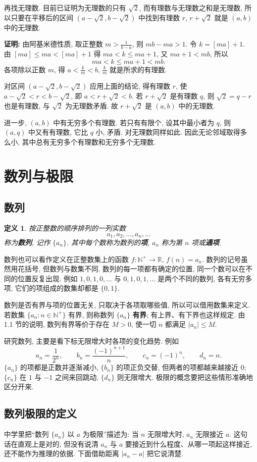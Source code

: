 \documentclass[UTF8,openany]{ctexbook}
\theoremstyle{chinesetextbook}
\newtheorem{definition}{定义}[section]
\newenvironment{cnproof}{\par\indent\textbf{证明:} \ignorespaces}{\par}
\begin{document}
再找无理数. 目前已证明为无理数的只有 $\sqrt2$, 而有理数与无理数之和是无理数, 所以只要在平移后的区间 $(a-\sqrt2,b-\sqrt2)$ 中找到有理数 $r$, $r+\sqrt2$ 就是 $(a,b)$ 中的无理数.
\begin{cnproof}
由阿基米德性质, 取正整数 $\displaystyle m>\frac1{b-a}$, 则 $mb-ma>1$. 令 $k=[ma]+1$. 由 $[ma]\le ma<[ma]+1$ 得 $ma<k\le ma+1$, 又 $ma+1<mb$, 所以
\[
ma<k\le ma+1<mb.
\]
各项除以正数 $m$, 得 $\displaystyle a<\frac km<b$, $\displaystyle\frac km$ 就是所求的有理数.

对区间 $(a-\sqrt2,b-\sqrt2)$ 应用上面的结论, 得有理数 $r$, 使 $a-\sqrt2<r<b-\sqrt2$, 即 $a<r+\sqrt2<b$. 若 $r+\sqrt2$ 是有理数 $q$, 则 $\sqrt2=q-r$ 也是有理数, 与 $\sqrt2$ 为无理数矛盾. 故 $r+\sqrt2$ 是 $(a,b)$ 中的无理数.
\end{cnproof}
进一步, $(a,b)$ 中有无穷多个有理数. 若只有有限个, 设其中最小者为 $q$, 则 $(a,q)$ 中又有有理数, 它比 $q$ 小, 矛盾. 对无理数同样如此. 因此无论邻域取得多么小, 其中总有无穷多个有理数和无穷多个无理数.
\section{数列与极限}
\subsection{数列}
\begin{definition}
按正整数的顺序排列的一列实数
\[
a_1,a_2,\ldots,a_n,\ldots
\]
称为\textbf{数列}, 记作 $\{a_n\}$. 其中每个数称为数列的\textbf{项}, $a_n$ 称为第 $n$ 项或\textbf{通项}.
\end{definition}
数列也可以看作定义在正整数集上的函数 $f:\mathbb N^+\to\mathbb R$, $f(n)=a_n$. 数列的记号虽然用花括号, 但数列与数集不同. 数列的每一项都有确定的位置, 同一个数可以在不同的位置反复出现. 例如 $1,0,1,0,\ldots$ 与 $0,1,0,1,\ldots$ 是两个不同的数列, 各有无穷多项, 它们的项组成的数集却都是 $\{0,1\}$.

数列是否有界与项的位置无关, 只取决于各项取哪些值, 所以可以借用数集来定义. 若数集 $\{a_n:n\in\mathbb N^+\}$ 有界, 则称数列 $\{a_n\}$ \textbf{有界}; 有上界、有下界也这样规定. 由 1.1 节的说明, 数列有界等价于存在 $M>0$, 使一切 $n$ 都满足 $|a_n|\le M$.

研究数列, 主要是看下标无限增大时各项的变化趋势. 例如
\[
a_n=\frac1{2^n},\qquad b_n=\frac{(-1)^{n+1}}n,\qquad c_n=(-1)^n,\qquad d_n=n.
\]
$\{a_n\}$ 的项都是正数并逐渐减小, $\{b_n\}$ 的项正负交替, 但两者的项都越来越接近 $0$; $\{c_n\}$ 在 $1$ 与 $-1$ 之间来回跳动, $\{d_n\}$ 则无限增大. 极限的概念要把这些情形准确地区分开来.
\subsection{数列极限的定义}
中学里把“数列 $\{a_n\}$ 以 $a$ 为极限”描述为: 当 $n$ 无限增大时, $a_n$ 无限接近 $a$. 这句话在直观上是对的, 但没有说清 $a_n$ 与 $a$ 要接近到什么程度、从哪一项起这样接近, 还不能作为推理的依据. 下面借助距离 $|a_n-a|$ 把它说清楚.
\end{document}
